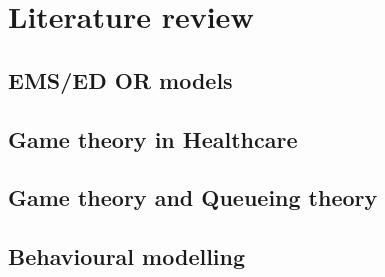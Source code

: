 \section{Literature review}

\subsection{EMS/ED OR models}
\subsection{Game theory in Healthcare}
\subsection{Game theory and Queueing theory}
\subsection{Behavioural modelling}